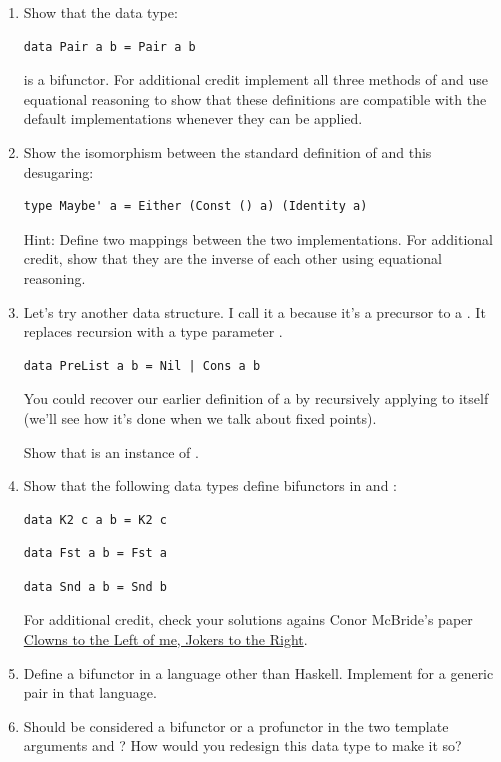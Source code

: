 \begin{enumerate}
\tightlist
\item
  Show that the data type:

\begin{Verbatim}
data Pair a b = Pair a b
\end{Verbatim}

  is a bifunctor. For additional credit implement all three methods of
   and use equational reasoning to show that these
  definitions are compatible with the default implementations whenever
  they can be applied.
\item
  Show the isomorphism between the standard definition of 
  and this desugaring:

\begin{Verbatim}
type Maybe' a = Either (Const () a) (Identity a)
\end{Verbatim}

  Hint: Define two mappings between the two implementations. For
  additional credit, show that they are the inverse of each other using
  equational reasoning.
\item
  Let's try another data structure. I call it a  because
  it's a precursor to a . It replaces recursion with a type
  parameter .

\begin{Verbatim}
data PreList a b = Nil | Cons a b
\end{Verbatim}

  You could recover our earlier definition of a  by
  recursively applying  to itself (we'll see how it's
  done when we talk about fixed points).

  Show that  is an instance of .
\item
  Show that the following data types define bifunctors in  and
  :

\begin{Verbatim}
data K2 c a b = K2 c
\end{Verbatim}

\begin{Verbatim}
data Fst a b = Fst a
\end{Verbatim}

\begin{Verbatim}
data Snd a b = Snd b
\end{Verbatim}

  For additional credit, check your solutions agains Conor McBride's
  paper \href{http://strictlypositive.org/CJ.pdf}{Clowns to the Left of
  me, Jokers to the Right}.
\item
  Define a bifunctor in a language other than Haskell. Implement
   for a generic pair in that language.
\item
  Should  be considered a bifunctor or a profunctor in
  the two template arguments  and ? How would you
  redesign this data type to make it so?
\end{enumerate}